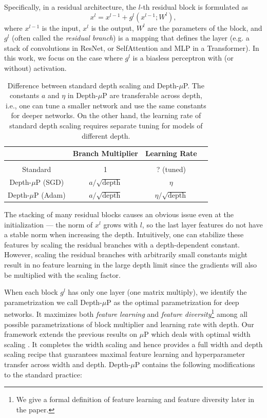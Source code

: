 \documentclass{article}
\theoremstyle{plain}
\theoremstyle{definition}
\begin{document}
Specifically, in a residual architecture, the $l$-th residual block is formulated as
\[x^l=x^{l-1} + g^l(x^{l-1};W^l),\] 
where $x^{l-1}$ is the input, $x^l$ is the output, $W^l$ are the parameters of the block, and $g^l$ (often called the \emph{residual branch}) is a mapping that defines the layer (e.g. a stack of convolutions in ResNet, or SelfAttention and MLP in a Transformer). In this work, we focus on the case where $g^l$ is a biasless perceptron with (or without) activation.

\begin{table}[t]
\begin{center}
\caption{Difference between standard depth scaling and Depth-$\mu$P. The constants $a$ and $\eta$ in Depth-$\mu$P are transferable across depth, i.e., one can tune a smaller network and use the same constants for deeper networks. On the other hand, the learning rate of standard depth scaling requires separate tuning for models of different depth. }
\begin{tabular}{c c c c} 
 \hline
  & Branch Multiplier & Learning Rate  \\
 \hline
 \vspace{-0.7em}
 \\
 Standard & 1 & ? (tuned) \\ 

 Depth-$\mu$P (SGD) & {\color{Maroon} $a/\sqrt{\textrm{depth}}$} & {\color{Maroon} $\eta$} \\ 

 Depth-$\mu$P (Adam) & {\color{Maroon} $a/\sqrt{\textrm{depth}}$} & {\color{Maroon} $\eta/\sqrt{\textrm{depth}}$}  \\
\hline

\end{tabular}
\end{center}
\end{table}

The stacking of many residual blocks causes an obvious issue even at the initialization --- the norm of $x^l$ grows with $l$, so the last layer features do not have a stable norm when increasing the depth. Intuitively, one can stabilize these features by scaling the residual branches with a depth-dependent constant. However, scaling the residual branches with arbitrarily small constants might result in no feature learning in the large depth limit since the gradients will also be multiplied with the scaling factor. 

When each block $g^l$ has only one layer (one matrix multiply), we identify the parametrization we call Depth-$\mu$P as the optimal parametrization for deep networks.
It maximizes both \emph{feature learning} and \emph{feature diversity}\footnote{We give a formal definition of feature learning and feature diversity later in the paper.}  among all possible parametrizations of block multiplier and learning rate with depth.
Our framework extends the previous results on $\mu$P which deals with optimal width scaling \citep{yang2022tensor}. It completes the width scaling and hence provides a full width and depth scaling recipe that guarantees maximal feature learning and hyperparameter transfer across width and depth.  %
Depth-$\mu$P contains the following modifications to the standard practice:
\end{document}
